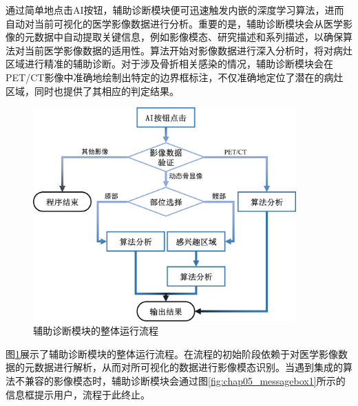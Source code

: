 通过简单地点击AI按钮，辅助诊断模块便可迅速触发内嵌的深度学习算法，进而自动对当前可视化的医学影像数据进行分析。重要的是，辅助诊断模块会从医学影像的元数据中自动提取关键信息，例如影像模态、研究描述和系列描述，以确保算法对当前医学影像数据的适用性。算法开始对影像数据进行深入分析时，将对病灶区域进行精准的辅助诊断。对于涉及骨折相关感染的情况，辅助诊断模块会在PET/CT影像中准确地绘制出特定的边界框标注，不仅准确地定位了潜在的病灶区域，同时也提供了其相应的判定结果。

\begin{figure}[htbp]
  \centering
  \includegraphics[width=0.9\textwidth]{figures/chap05_diagnose.jpg}
  \caption{辅助诊断模块的整体运行流程}
  \label{fig:chap05_diagnose}
\end{figure}

图\ref{fig:chap05_diagnose}展示了辅助诊断模块的整体运行流程。在流程的初始阶段依赖于对医学影像数据的元数据进行解析，从而对所可视化的数据进行影像模态识别。当遇到集成的算法不兼容的影像模态时，辅助诊断模块会通过图\ref{fig:chap05_messagebox1}所示的信息框提示用户，流程于此终止。

